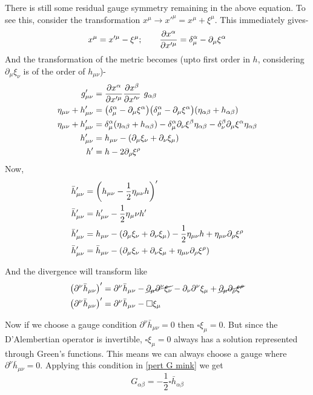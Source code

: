 \documentclass[12pt, letterpaper]{report}
\begin{document}
There is still some residual gauge symmetry remaining in the above equation. To see this, consider the transformation $x^\mu\to x'^\mu= x^\mu+\xi^\mu$. This immediately gives- $$x^\mu= x'^\mu-\xi^\mu;\qquad \pdv{x^\alpha}{x'^\mu}= \delta_\mu^\alpha-\partial_\mu\xi^\alpha$$
And the transformation of the metric becomes (upto first order in $h$, considering $\partial_\mu\xi_\nu$ is of the order of $h_{\mu\nu}$)- 
\begin{align*}
    g'_{\mu\nu}&= \pdv{x^\alpha}{x'^\mu}\pdv{x^\beta}{x'^\nu}\ g_{\alpha\beta}\\
    \eta_{\mu\nu}+ h'_{\mu\nu}&= \qty(\delta_\mu^\alpha-\partial_\mu\xi^\alpha)\qty(\delta_\mu^\alpha-\partial_\mu\xi^\alpha)\qty(\eta_{\alpha\beta}+h_{\alpha\beta})\\
    \eta_{\mu\nu}+ h'_{\mu\nu}&= \delta_\mu^\alpha\qty(\eta_{\alpha\beta}+h_{\alpha\beta})-\delta_\mu^\alpha\partial_\nu\xi^\beta\eta_{\alpha\beta}-\delta_\nu^\beta\partial_\mu\xi^\alpha\eta_{\alpha\beta}\\
    h'_{\mu\nu}&= h_{\mu\nu}-\qty(\partial_\mu\xi_\nu+\partial_\nu\xi_\mu)\\
    h'&= h-2\partial_\rho\xi^\rho
\end{align*}
Now, 
\begin{align*}
    \bar{h}'_{\mu\nu}&= \qty(h_{\mu\nu}-\frac{1}{2}\eta_{\mu\nu}h)'\\
    \bar{h}'_{\mu\nu}&= h'_{\mu\nu}-\frac{1}{2}\eta{_\mu\nu}h'\\
    \bar{h}'_{\mu\nu}&= h_{\mu\nu}-\qty(\partial_\mu\xi_\nu+\partial_\nu\xi_\mu)- \frac{1}{2}\eta_{\mu\nu}h+\eta_{\mu\nu}\partial_\rho\xi^\rho\\
    \bar{h}'_{\mu\nu} &= \bar{h}_{\mu\nu}-\qty(\partial_\mu\xi_\nu+\partial_\nu\xi_\mu+ \eta_{\mu\nu}\partial_\rho\xi^\rho)
\end{align*}

And the divergence will transform like 
\begin{align*}
    \qty(\partial^\nu\bar{h}_{\mu\nu})' &= \partial^\nu\bar{h}_{\mu\nu}-\cancel{\partial_\mu\partial^\nu\xi_\nu}-\partial_\nu\partial^\nu\xi_\mu+ \cancel{\partial_\mu\partial_\rho\xi^\rho}\\
    \qty(\partial^\nu\bar{h}_{\mu\nu})' &= \partial^\nu\bar{h}_{\mu\nu}-\square\xi_\mu
\end{align*}

Now if we choose a gauge condition $\partial^\nu\bar{h}_{\mu\nu}= 0$ then $\square\xi_\mu= 0$. But since the D'Alembertian operator is invertible, $\square\xi_\mu= 0$ always has a solution represented through Green's functions. This means we can always choose a gauge where $\partial^\nu\bar{h}_{\mu\nu}= 0$. Applying this condition in \cref{pert G mink} we get $$G_{\alpha\beta}= -\frac{1}{2}\square\bar{h}_{\alpha\beta}$$
\end{document}
